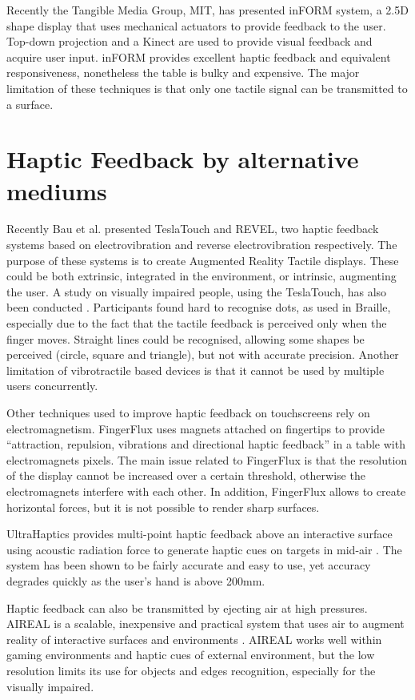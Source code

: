 Recently the Tangible Media Group, MIT, has presented inFORM system, a 2.5D shape display that uses mechanical actuators to provide feedback to the user\cite{follmer2013inform}. Top-down projection and a Kinect  are used to provide visual feedback and acquire user input. inFORM provides excellent haptic feedback and equivalent responsiveness, nonetheless the table is bulky and expensive. The major limitation of these techniques is that only one tactile signal can be transmitted to a surface. 

\section{Haptic Feedback by alternative mediums}

Recently Bau et al. presented TeslaTouch\cite{bau2010teslatouch} and REVEL\cite{bau2012revel}, two haptic feedback systems based on electrovibration and reverse electrovibration respectively. The purpose of these systems is to create Augmented Reality Tactile displays. These could be both extrinsic, integrated in the environment, or intrinsic, augmenting the user. A study on visually impaired people, using the TeslaTouch, has also been conducted \cite{xu2011tactile}. Participants found hard to recognise dots, as used in Braille, especially due to the fact that the tactile feedback is perceived only when the finger moves. Straight lines could be recognised, allowing some shapes be perceived (circle, square and triangle), but not with accurate precision. Another limitation of vibrotractile based devices is that it cannot be used by multiple users concurrently. 

Other techniques used to improve haptic feedback on touchscreens rely on electromagnetism. FingerFlux \cite{weiss2011fingerflux} uses magnets attached on fingertips to provide ``attraction, repulsion, vibrations and directional haptic feedback'' in a table with electromagnets pixels. The main issue related to FingerFlux is that the resolution of the display cannot be increased over a certain threshold, otherwise the electromagnets interfere with each other. In addition, FingerFlux allows to create horizontal forces, but it is not possible to render sharp surfaces.    

UltraHaptics provides multi-point haptic feedback above an interactive surface using acoustic radiation force to generate haptic cues on targets in mid-air \cite{carter2013ultrahaptics}. The system has been shown to be fairly accurate and easy to use, yet accuracy degrades quickly as the user's hand is above 200mm. 

Haptic feedback can also be transmitted by ejecting air at high pressures. AIREAL is a scalable, inexpensive and practical system that uses air to augment reality of interactive surfaces and environments \cite{sodhi2013aireal}. AIREAL works well within gaming environments and haptic cues of external environment, but the low resolution limits its use for objects and edges recognition, especially for the visually impaired.